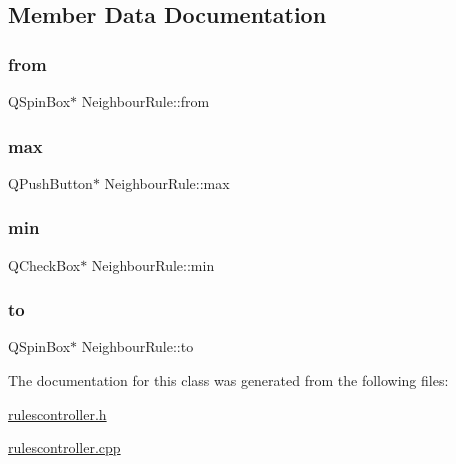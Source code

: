 \subsection{Member Data Documentation}
\mbox{\label{class_neighbour_rule_aa0dd87a547aa630fc741bcd1ed7c3007}} 
\subsubsection{\texorpdfstring{from}{from}}
{\footnotesize\ttfamily Q\+Spin\+Box$\ast$ Neighbour\+Rule\+::from\hspace{0.3cm}{\ttfamily [private]}}

\mbox{\label{class_neighbour_rule_ab62a36811d4af2b13f7d25820a8eaab6}} 
\subsubsection{\texorpdfstring{max}{max}}
{\footnotesize\ttfamily Q\+Push\+Button$\ast$ Neighbour\+Rule\+::max\hspace{0.3cm}{\ttfamily [private]}}

\mbox{\label{class_neighbour_rule_a55af8eae63687835de271eee068732ce}} 
\subsubsection{\texorpdfstring{min}{min}}
{\footnotesize\ttfamily Q\+Check\+Box$\ast$ Neighbour\+Rule\+::min\hspace{0.3cm}{\ttfamily [private]}}

\mbox{\label{class_neighbour_rule_a9fd5cf760c4ccfeefb104f24e6488a51}} 
\subsubsection{\texorpdfstring{to}{to}}
{\footnotesize\ttfamily Q\+Spin\+Box$\ast$ Neighbour\+Rule\+::to\hspace{0.3cm}{\ttfamily [private]}}



The documentation for this class was generated from the following files\+:\begin{DoxyCompactItemize}
\item 
\mbox{\hyperlink{rulescontroller_8h}{rulescontroller.\+h}}\item 
\mbox{\hyperlink{rulescontroller_8cpp}{rulescontroller.\+cpp}}\end{DoxyCompactItemize}
